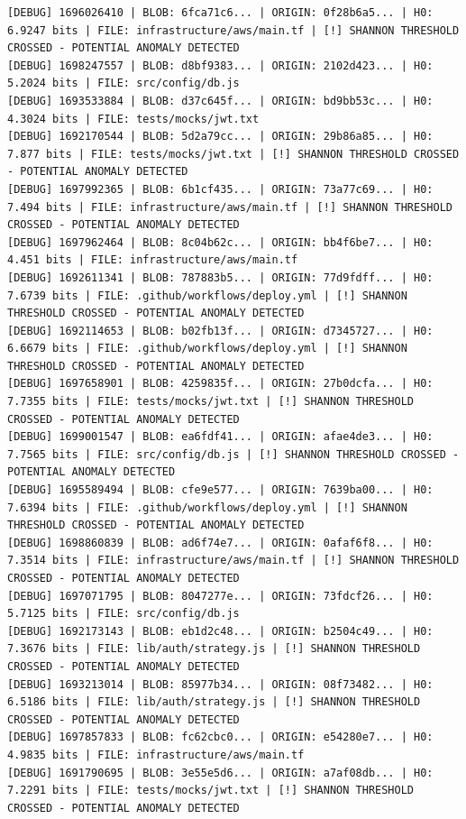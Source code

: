 \documentclass[12pt, a4paper, oneside]{report}
\begin{document}
\begin{lstlisting}[basicstyle=\tiny\ttfamily]
[DEBUG] 1696026410 | BLOB: 6fca71c6... | ORIGIN: 0f28b6a5... | H0: 6.9247 bits | FILE: infrastructure/aws/main.tf | [!] SHANNON THRESHOLD CROSSED - POTENTIAL ANOMALY DETECTED
[DEBUG] 1698247557 | BLOB: d8bf9383... | ORIGIN: 2102d423... | H0: 5.2024 bits | FILE: src/config/db.js
[DEBUG] 1693533884 | BLOB: d37c645f... | ORIGIN: bd9bb53c... | H0: 4.3024 bits | FILE: tests/mocks/jwt.txt
[DEBUG] 1692170544 | BLOB: 5d2a79cc... | ORIGIN: 29b86a85... | H0: 7.877 bits | FILE: tests/mocks/jwt.txt | [!] SHANNON THRESHOLD CROSSED - POTENTIAL ANOMALY DETECTED
[DEBUG] 1697992365 | BLOB: 6b1cf435... | ORIGIN: 73a77c69... | H0: 7.494 bits | FILE: infrastructure/aws/main.tf | [!] SHANNON THRESHOLD CROSSED - POTENTIAL ANOMALY DETECTED
[DEBUG] 1697962464 | BLOB: 8c04b62c... | ORIGIN: bb4f6be7... | H0: 4.451 bits | FILE: infrastructure/aws/main.tf
[DEBUG] 1692611341 | BLOB: 787883b5... | ORIGIN: 77d9fdff... | H0: 7.6739 bits | FILE: .github/workflows/deploy.yml | [!] SHANNON THRESHOLD CROSSED - POTENTIAL ANOMALY DETECTED
[DEBUG] 1692114653 | BLOB: b02fb13f... | ORIGIN: d7345727... | H0: 6.6679 bits | FILE: .github/workflows/deploy.yml | [!] SHANNON THRESHOLD CROSSED - POTENTIAL ANOMALY DETECTED
[DEBUG] 1697658901 | BLOB: 4259835f... | ORIGIN: 27b0dcfa... | H0: 7.7355 bits | FILE: tests/mocks/jwt.txt | [!] SHANNON THRESHOLD CROSSED - POTENTIAL ANOMALY DETECTED
[DEBUG] 1699001547 | BLOB: ea6fdf41... | ORIGIN: afae4de3... | H0: 7.7565 bits | FILE: src/config/db.js | [!] SHANNON THRESHOLD CROSSED - POTENTIAL ANOMALY DETECTED
[DEBUG] 1695589494 | BLOB: cfe9e577... | ORIGIN: 7639ba00... | H0: 7.6394 bits | FILE: .github/workflows/deploy.yml | [!] SHANNON THRESHOLD CROSSED - POTENTIAL ANOMALY DETECTED
[DEBUG] 1698860839 | BLOB: ad6f74e7... | ORIGIN: 0afaf6f8... | H0: 7.3514 bits | FILE: infrastructure/aws/main.tf | [!] SHANNON THRESHOLD CROSSED - POTENTIAL ANOMALY DETECTED
[DEBUG] 1697071795 | BLOB: 8047277e... | ORIGIN: 73fdcf26... | H0: 5.7125 bits | FILE: src/config/db.js
[DEBUG] 1692173143 | BLOB: eb1d2c48... | ORIGIN: b2504c49... | H0: 7.3676 bits | FILE: lib/auth/strategy.js | [!] SHANNON THRESHOLD CROSSED - POTENTIAL ANOMALY DETECTED
[DEBUG] 1693213014 | BLOB: 85977b34... | ORIGIN: 08f73482... | H0: 6.5186 bits | FILE: lib/auth/strategy.js | [!] SHANNON THRESHOLD CROSSED - POTENTIAL ANOMALY DETECTED
[DEBUG] 1697857833 | BLOB: fc62cbc0... | ORIGIN: e54280e7... | H0: 4.9835 bits | FILE: infrastructure/aws/main.tf
[DEBUG] 1691790695 | BLOB: 3e55e5d6... | ORIGIN: a7af08db... | H0: 7.2291 bits | FILE: tests/mocks/jwt.txt | [!] SHANNON THRESHOLD CROSSED - POTENTIAL ANOMALY DETECTED

\end{lstlisting}
\end{document}
